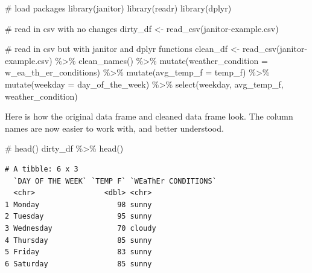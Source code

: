 \documentclass[
  letterpaper,
  DIV=11,
  numbers=noendperiod]{scrreprt}
\newenvironment{Shaded}{\begin{snugshade}}{\end{snugshade}}
\newcommand{\AttributeTok}[1]{\textcolor[rgb]{0.40,0.45,0.13}{#1}}
\newcommand{\CommentTok}[1]{\textcolor[rgb]{0.37,0.37,0.37}{#1}}
\newcommand{\FunctionTok}[1]{\textcolor[rgb]{0.28,0.35,0.67}{#1}}
\newcommand{\NormalTok}[1]{\textcolor[rgb]{0.00,0.23,0.31}{#1}}
\newcommand{\OtherTok}[1]{\textcolor[rgb]{0.00,0.23,0.31}{#1}}
\newcommand{\SpecialCharTok}[1]{\textcolor[rgb]{0.37,0.37,0.37}{#1}}
\newcommand{\StringTok}[1]{\textcolor[rgb]{0.13,0.47,0.30}{#1}}
\begin{document}
\begin{Shaded}
\begin{Highlighting}[]
\CommentTok{\# load packages}
\FunctionTok{library}\NormalTok{(janitor)}
\FunctionTok{library}\NormalTok{(readr)}
\FunctionTok{library}\NormalTok{(dplyr)}

\CommentTok{\# read in csv with no changes}
\NormalTok{dirty\_df }\OtherTok{\textless{}{-}} \FunctionTok{read\_csv}\NormalTok{(}\StringTok{\textquotesingle{}janitor{-}example.csv\textquotesingle{}}\NormalTok{)}

\CommentTok{\# read in csv but with janitor and dplyr functions}
\NormalTok{clean\_df }\OtherTok{\textless{}{-}} \FunctionTok{read\_csv}\NormalTok{(}\StringTok{\textquotesingle{}janitor{-}example.csv\textquotesingle{}}\NormalTok{) }\SpecialCharTok{\%\textgreater{}\%}
  \FunctionTok{clean\_names}\NormalTok{() }\SpecialCharTok{\%\textgreater{}\%}
  \FunctionTok{mutate}\NormalTok{(}\AttributeTok{weather\_condition =}\NormalTok{ w\_ea\_th\_er\_conditions) }\SpecialCharTok{\%\textgreater{}\%}
  \FunctionTok{mutate}\NormalTok{(}\AttributeTok{avg\_temp\_f =}\NormalTok{ temp\_f) }\SpecialCharTok{\%\textgreater{}\%}
  \FunctionTok{mutate}\NormalTok{(}\AttributeTok{weekday =}\NormalTok{ day\_of\_the\_week) }\SpecialCharTok{\%\textgreater{}\%}
  \FunctionTok{select}\NormalTok{(weekday, avg\_temp\_f, weather\_condition)}
\end{Highlighting}
\end{Shaded}

Here is how the original data frame and cleaned data frame look. The
column names are now easier to work with, and better understood.

\begin{Shaded}
\begin{Highlighting}[]
\CommentTok{\# head()}
\NormalTok{dirty\_df }\SpecialCharTok{\%\textgreater{}\%} 
  \FunctionTok{head}\NormalTok{()}
\end{Highlighting}
\end{Shaded}

\begin{verbatim}
# A tibble: 6 x 3
  `DAY OF THE WEEK` `TEMP F` `WEaThEr CONDITIONS`
  <chr>                <dbl> <chr>               
1 Monday                  98 sunny               
2 Tuesday                 95 sunny               
3 Wednesday               70 cloudy              
4 Thursday                85 sunny               
5 Friday                  83 sunny               
6 Saturday                85 sunny               
\end{verbatim}
\end{document}
